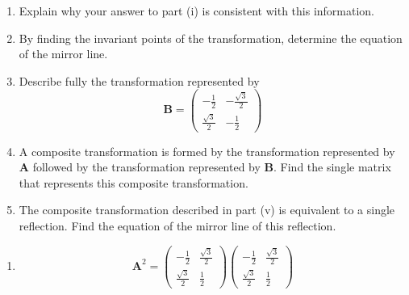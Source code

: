 \documentclass[leqno]{article}
\begin{document}
\begin{enumerate}[
  label=\textbf{\arabic*.},
  leftmargin=*,
  topsep=0pt,
  partopsep=0pt,
  parsep=0pt
]
\begin{enumerate}[label=\textbf{(\roman*)}, resume]
  \item Explain why your answer to part (i) is consistent with this information.  \\
  \item By finding the invariant points of the transformation, determine the equation of the mirror line.  \\
  \item Describe fully the transformation represented by
  \[
  \mathbf{B}=\begin{pmatrix}
  -\frac{1}{2} & -\frac{\sqrt{3}}{2}\\[6pt]
  \frac{\sqrt{3}}{2} & -\frac{1}{2}
  \end{pmatrix}
  \]
  \item A composite transformation is formed by the transformation represented by $\mathbf{A}$ followed by the transformation represented by $\mathbf{B}$. Find the single matrix that represents this composite transformation.  \\
  \item The composite transformation described in part (v) is equivalent to a single reflection. Find the equation of the mirror line of this reflection.  \\
\end{enumerate}

\vspace*{10pt}

\begin{djsSolution}
\begin{enumerate}[label=\textbf{(\roman*)}]
\item
\[
\mathbf{A}^2
=
\begin{pmatrix}
-\frac12 & \frac{\sqrt3}{2}\\[4pt]
\frac{\sqrt3}{2} & \frac12
\end{pmatrix}
\begin{pmatrix}
-\frac12 & \frac{\sqrt3}{2}\\[4pt]
\frac{\sqrt3}{2} & \frac12
\end{pmatrix}
\]


\end{enumerate}
\end{djsSolution}
\end{enumerate}
\end{document}
